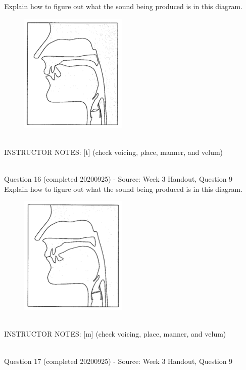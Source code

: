 \documentclass[12pt]{article}
\begin{document}
Explain how to figure out what the sound being produced is in this diagram.\\

\begin{figure}[H]
\includegraphics{../images/sagittal_t.png}
\end{figure}

~\\
INSTRUCTOR NOTES: [t] (check voicing, place, manner, and velum)


~\\

{\large Question 16} (completed 20200925) - Source: Week 3 Handout, Question 9\\

Explain how to figure out what the sound being produced is in this diagram.\\

\begin{figure}[H]
\includegraphics{../images/sagittal_m.png}
\end{figure}

~\\
INSTRUCTOR NOTES: [m] (check voicing, place, manner, and velum)


~\\

{\large Question 17} (completed 20200925) - Source: Week 3 Handout, Question 9\\
\end{document}
